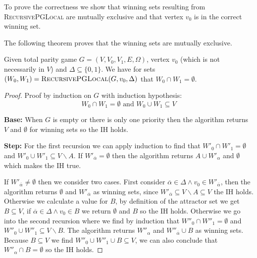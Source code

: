 To prove the correctness we show that winning sets resulting from \textsc{RecursivePGLocal} are mutually exclusive and that vertex $v_0$ is in the correct winning set.

The following theorem proves that the winning sets are mutually exclusive.
\begin{theorem}
	Given total parity game $G = (V,V_0,V_1,E,\Omega)$, vertex $v_0$ (which is not necessarily in $V$) and $\Delta \subseteq \{0,1\}$. We have for sets $(W_0,W_1) = \textsc{RecursivePGLocal}(G,v_0,\Delta)$ that 
	$W_0 \cap W_1 = \emptyset$.
	\begin{proof}
		Proof by induction on $G$ with induction hypothesis:
		\[ W_0 \cap W_1 = \emptyset\text{ and }W_0 \cup W_1 \subseteq V \]
		
		\textbf{Base:} When $G$ is empty or there is only one priority then the algorithm returns $V$ and $\emptyset$ for winning sets so the IH holds.
		
		\textbf{Step:} For the first recursion we can apply induction to find that $W'_0 \cap W'_1 = \emptyset$ and $W'_0 \cup W'_1 \subseteq V \backslash A$. If $W'_{\overline{\alpha}} = \emptyset$ then the algorithm returns $A \cup W'_\alpha$ and $\emptyset$ which makes the IH true.
		
		If $W'_{\overline{\alpha}} \neq \emptyset$ then we consider two cases. First consider $\overline{\alpha} \in \Delta \wedge v_0 \in W'_{\overline{\alpha}}$, then the algorithm returns $\emptyset$ and $W'_{\overline{\alpha}}$ as winning sets, since $W'_{\overline{\alpha}} \subseteq V\backslash A \subseteq V$ the IH holds. Otherwise we calculate a value for $B$, by definition of the attractor set we get $B \subseteq V$, if $\overline{\alpha} \in \Delta \wedge v_0 \in B$ we return $\emptyset$ and $B$ so the IH holds. Otherwise we go into the second recursion where we find by induction that $W''_0 \cap W''_1 = \emptyset$ and $W''_0 \cup W''_1 \subseteq V \backslash B$. The algorithm returns $W''_\alpha$ and $W''_{\overline{\alpha}} \cup B$ as winning sets. Because $B \subseteq V$ we find $W''_0 \cup W''_1 \cup B \subseteq V$, we can also conclude that $W''_\alpha \cap B = \emptyset$ so the IH holds.
	\end{proof}
\end{theorem}

